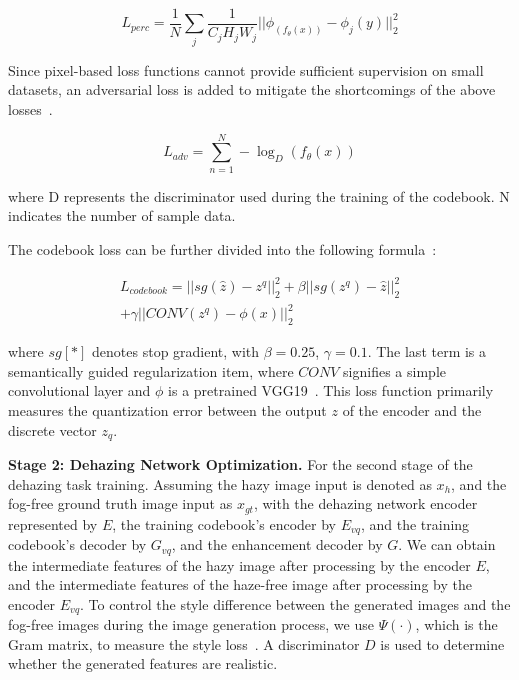 \documentclass[journal]{IEEEtran}
\begin{document}
\begin{equation}
	\label{perceptual_loss}
	L_ {perc} = \frac{1}{N} \sum_{j} \frac{1}{C_{j}H_{j}W_{j}} || \phi_(f_{\theta}(x)) - \phi_{j}(y)||_{2}^{2}
\end{equation}

Since pixel-based loss functions cannot provide sufficient supervision on small datasets, an adversarial loss is added to mitigate the shortcomings of the above losses~\cite{zhu2017unpaired}.

\begin{equation}
	\label{adversarial_loss}
	L_{adv} = \sum_{n=1}^{N} - \log_{D} (f_{\theta}(x))
\end{equation}

\noindent where D represents the discriminator used during the training of the codebook. N indicates the number of sample data.


The codebook loss can be further divided into the following formula~\cite{chen2022real}:

\begin{equation}
	\label{codebook_loss}
	\begin{split}
		L_ {codebook} = || sg(\widehat{z}) - z^ {q} ||_{2}^{2} + \beta ||sg(z^{q})- \widehat{z}||_{2}^{2} \\
		+ \gamma ||CONV(z^{q}) - \phi(x)||_{2}^{2}
	\end{split}
\end{equation}

\noindent where $sg[*]$ denotes stop gradient, with $\beta = 0.25$, $\gamma = 0.1$. The last term is a semantically guided regularization item, where $CONV$ signifies a simple convolutional layer and $\phi$ is a pretrained VGG19~\cite{simonyan2014very}. This loss function primarily measures the quantization error between the output $z$ of the encoder and the discrete vector $z_{q}$.

	{\bf{Stage 2: Dehazing Network Optimization.}} For the second stage of the dehazing task training. Assuming the hazy image input is denoted as $x_h$, and the fog-free ground truth image input as $x_{gt}$, with the dehazing network encoder represented by $E$, the training codebook's encoder by $E_{vq}$, and the training codebook's decoder by $G_{vq}$, and the enhancement decoder by $G$. We can obtain the intermediate features of the hazy image after processing by the encoder $E$, and the intermediate features of the haze-free image after processing by the encoder $E_{vq}$. To control the style difference between the generated images and the fog-free images during the image generation process, we use $\Psi(\cdot)$, which is the Gram matrix, to measure the style loss~\cite{gondal2019unreasonable}. A discriminator $D$ is used to determine whether the generated features are realistic.
\end{document}

